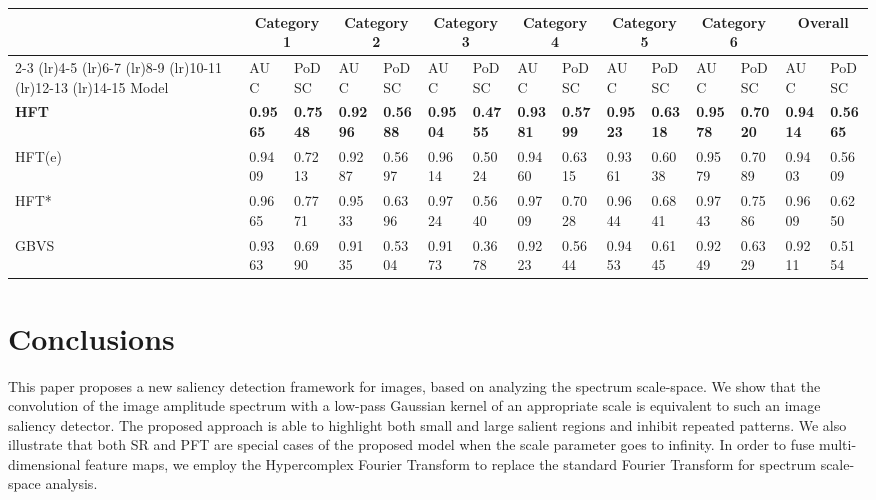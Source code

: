 \documentclass[10pt,journal,cspaper,compsoc]{IEEEtran}
\begin{document}
\begin{table*}[htbp] 	
\caption{Comparison between HFT class models and model in subset 3 (optimal smoothing parameters and center-bias for each model)}
\label{GBVS}	
\centering 	
\begin{tabular}{@{}lp{.78cm}p{.78cm}p{.78cm}p{.78cm}p{.78cm}p{.78cm}p{.78cm}p{.78cm}p{.78cm}p{.78cm}p{.78cm}p{.78cm}p{.78cm}p{.78cm}@{}}
\toprule
&\multicolumn{2}{c}{Category 1}
&\multicolumn{2}{c}{Category 2}
&\multicolumn{2}{c}{Category 3}
&\multicolumn{2}{c}{Category 4}
&\multicolumn{2}{c}{Category 5}
&\multicolumn{2}{c}{Category 6}
&\multicolumn{2}{c}{Overall}\\
\cmidrule(lr){2-3} \cmidrule(lr){4-5} \cmidrule(lr){6-7} \cmidrule(lr){8-9} \cmidrule(lr){10-11} \cmidrule(lr){12-13} \cmidrule(lr){14-15}
Model & \scriptsize{AUC} & \scriptsize{PoDSC}
& \scriptsize{AUC} & \scriptsize{PoDSC}
& \scriptsize{AUC} & \scriptsize{PoDSC}
& \scriptsize{AUC} & \scriptsize{PoDSC}
& \scriptsize{AUC} & \scriptsize{PoDSC}
& \scriptsize{AUC} & \scriptsize{PoDSC}
& \scriptsize{AUC} & \scriptsize{PoDSC}\\
\midrule
{\bf HFT}       &{\bf0.9565} &{\bf0.7548} &{\bf0.9296} &{\bf0.5688} &{\bf0.9504} &{\bf0.4755} &{\bf0.9381} &{\bf0.5799} &{\bf0.9523} &{\bf0.6318} &{\bf0.9578} &{\bf0.7020} &{\bf0.9414} &{\bf0.5665}\\
HFT(e)    &0.9409 &0.7213 &0.9287 &0.5697 &0.9614 &0.5024 &0.9460 &0.6315 &0.9361 &0.6038 &0.9579 &0.7089 &0.9403 &0.5609\\
HFT*      &0.9665 &0.7771 &0.9533 &0.6396 &0.9724 &0.5640 &0.9709 &0.7028 &0.9644 &0.6841 &0.9743 &0.7586 &0.9609 &0.6250\\
GBVS      &0.9363 &0.6990 &0.9135 &0.5304 &0.9173 &0.3678 &0.9223 &0.5644 &0.9453 &0.6145 &0.9249 &0.6329 &0.9211 &0.5154\\
\bottomrule 	
\end{tabular} 	
\end{table*}






\section{Conclusions}


This paper proposes a new saliency detection framework for images, based on analyzing the spectrum scale-space. We show that the convolution of the image amplitude spectrum with a low-pass Gaussian kernel of an appropriate scale is equivalent to such an image saliency detector. The proposed approach is able to highlight both small and large salient regions and inhibit repeated patterns. We also illustrate that both SR and PFT are special cases of the proposed model when the scale parameter goes to infinity.
In order to fuse multi-dimensional feature maps, we employ the Hypercomplex Fourier Transform to replace the standard Fourier Transform for spectrum scale-space analysis.
\end{document}
